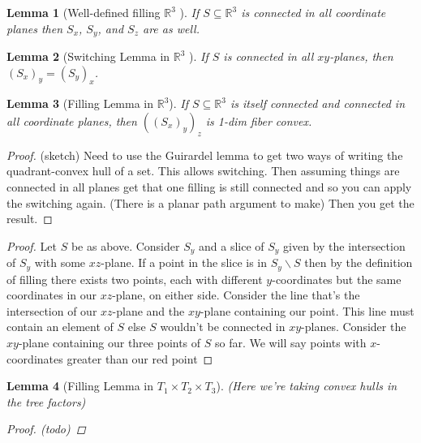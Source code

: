 \documentclass{article}
\newcommand{\sxyz}{((S_x)_y)_z}
\theoremstyle{mystyle}
\newtheorem{lem}{Lemma}[section]
\theoremstyle{remark}
\begin{document}
\begin{lem}
	[Well-defined filling \(\mathbb{R}^{3}\) ]

	If \(S \subseteq \mathbb{R}^{3}\) is connected in all coordinate planes then \(S_x\), \(S_{y}\), and \(S_{z}\) are as well. 
	

\end{lem}

\begin{lem}
	[Switching Lemma in \(\mathbb{R}^{3}\) ]
	 \label{lem:switch} 
	 If \(S\) is connected in all \(xy\)-planes, then \((S_{x})_{y} = (S_{y})_{x}\).
	
\end{lem}
\begin{lem}
    [Filling Lemma in \(\mathbb{R}^{3}\)]
	\label{lem:fillr3}
	If \(S \subseteq \mathbb{R}^{3}\) is itself connected and connected in all coordinate planes, then \(\sxyz\) is 1-dim fiber convex.
\end{lem}
\begin{proof}
    (sketch) Need to use the Guirardel lemma to get two ways of writing the quadrant-convex hull of a set. This allows switching. Then assuming things are connected in all planes get that one filling is still connected and so you can apply the switching again. (There is a planar path argument to make) Then you get the result.
\end{proof}
\begin{proof}
	Let \(S\) be as above. Consider \(S_{ y}\) and a slice of \(S_{ y}\) given by the intersection of \(S_{ y}\) with some \(xz\)-plane. If a point in the slice is in \(S_{y} \smallsetminus   S\) then by the definition of filling there exists two points, each with different \(y\)-coordinates but the same coordinates in our \(xz\)-plane, on either side. Consider the line that's the intersection of our \(xz\)-plane and the \(xy\)-plane containing our point. This line must contain an element of \(S\) else \(S\) wouldn't be connected in \(xy\)-planes. Consider the \(xy\)-plane containing our three points of \(S\) so far. We will say points with \(x\)-coordinates greater than our red point 
\end{proof}
\begin{lem}
    [Filling Lemma in \(T_{1} \times T_{2} \times T_{3}\)]
	\label{lem:fillt3}
    (Here we're taking convex hulls in the tree factors)
\begin{proof}
    (todo)
\end{proof}
\end{lem}
\end{document}
